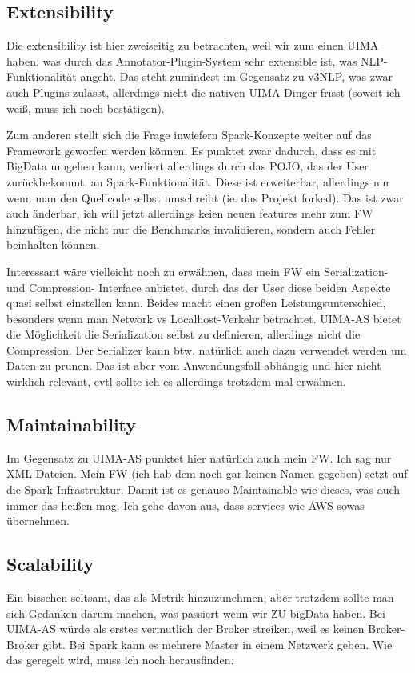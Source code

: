 \subsection{Extensibility}

Die extensibility ist hier zweiseitig zu betrachten, weil wir zum einen UIMA haben, was durch das Annotator-Plugin-System sehr extensible ist, was NLP-Funktionalität angeht. Das steht zumindest im Gegensatz zu v3NLP, was zwar auch Plugins zulässt, allerdings nicht die nativen UIMA-Dinger frisst (soweit ich weiß, muss ich noch bestätigen).

Zum anderen stellt sich die Frage inwiefern Spark-Konzepte weiter auf das Framework geworfen werden können. Es punktet zwar dadurch, dass es mit BigData umgehen kann, verliert allerdings durch das POJO, das der User zurückbekommt, an Spark-Funktionalität. Diese ist erweiterbar, allerdings nur wenn man den Quellcode selbst umschreibt (ie. das Projekt forked). Das ist zwar auch änderbar, ich will jetzt allerdings keien neuen features mehr zum FW hinzufügen, die nicht nur die Benchmarks invalidieren, sondern auch Fehler beinhalten können.

Interessant wäre vielleicht noch zu erwähnen, dass mein FW ein Serialization- und Compression- Interface anbietet, durch das der User diese beiden Aspekte quasi selbst einstellen kann. Beides macht einen großen Leistungsunterschied, besonders wenn man Network vs Localhost-Verkehr betrachtet. UIMA-AS bietet die Möglichkeit die Serialization selbst zu definieren, allerdings nicht die Compression. Der Serializer kann btw. natürlich auch dazu verwendet werden um Daten zu prunen. Das ist aber vom Anwendungsfall abhängig und hier nicht wirklich relevant, evtl sollte ich es allerdings trotzdem mal erwähnen.

\subsection{Maintainability}

Im Gegensatz zu UIMA-AS punktet hier natürlich auch mein FW. Ich sag nur XML-Dateien.
Mein FW (ich hab dem noch gar keinen Namen gegeben) setzt auf die Spark-Infrastruktur. Damit ist es genauso Maintainable wie dieses, was auch immer das heißen mag. Ich gehe davon aus, dass services wie AWS sowas übernehmen.

\subsection{Scalability}

Ein bisschen seltsam, das als Metrik hinzuzunehmen, aber trotzdem sollte man sich Gedanken darum machen, was passiert wenn wir ZU bigData haben. Bei UIMA-AS würde als erstes vermutlich der Broker streiken, weil es keinen Broker-Broker gibt. Bei Spark kann es mehrere Master in einem Netzwerk geben. Wie das geregelt wird, muss ich noch herausfinden.